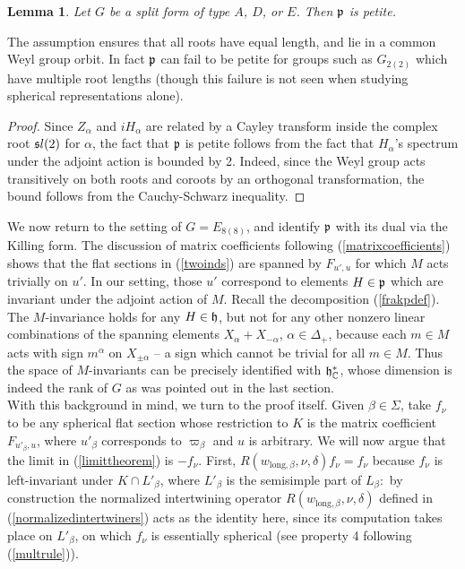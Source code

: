 \documentclass[12pt]{article}
\newtheorem{lem}[equation]{Lemma}
\numberwithin{equation}{section}
\renewcommand\a{\alpha}
\newcommand\D{\Delta}
\renewcommand\D{\Delta}
\newcommand{\C}{{\mathbb{C}}}
\renewcommand\({\left(}
\renewcommand\){\right)}
\begin{document}
\begin{lem}\label{lem:petite}
Let $G$ be a split form of type $A$, $D$, or $E$.  Then $\frak p$ is petite.
\end{lem}

\noindent The assumption ensures that all roots have equal length, and lie in a common Weyl group orbit.  In fact $\frak p$ can fail to be petite for groups such as $G_{2(2)}$ which have multiple root lengths (though this  failure is not seen when studying spherical representations alone).

\begin{proof}
 Since $Z_\a$ and $iH_\a$ are related by a Cayley transform inside the complex root ${\frak sl}(2)$ for $\alpha$, the fact that $\frak p$ is petite  follows from the fact that $H_\a$'s spectrum under the adjoint action is bounded by 2.  Indeed, since the Weyl group acts transitively on both roots and coroots by an orthogonal transformation,  the bound follows from the Cauchy-Schwarz inequality.
\end{proof}

We now return to the setting of $G=E_{8(8)}$, and
identify $\frak p$ with its dual via the Killing form.
The discussion of matrix coefficients following (\ref{matrixcoefficients}) shows that
the flat sections in  (\ref{twoinds})  are spanned by  $F_{u',u}$ for which $M$ acts trivially on $u'$.  In our setting, those $u'$ correspond to elements $H\in\frak p$ which are invariant under the adjoint action of $M$.  Recall the decomposition (\ref{frakpdef}).  The $M$-invariance holds for any $H\in \frak h$, but not for any other nonzero linear combinations of the spanning elements $X_\a+X_{-\a}$, $\a\in \D_+$, because each $m\in M$ acts with sign $m^\alpha$ on $X_{\pm \a}$ -- a sign which cannot be trivial for all $m\in M$.   Thus the space of $M$-invariants can be precisely identified with $\frak h^*_\C$, whose dimension is indeed the rank of $G$ as   was pointed out in the last section.\\


With this background in mind, we turn to the proof itself.
Given $\beta\in\Sigma$, take $f_\nu$ to be any spherical flat section whose restriction to $K$ is the matrix coefficient $F_{u'_\beta,u}$,
where $u'_\beta$ corresponds to $\varpi_\beta$ and $u$ is arbitrary.
We will now argue that the limit in (\ref{limittheorem}) is $-f_\nu$.  First, $R(w_{\text{long},\beta},\nu,\delta)f_\nu=f_\nu$ because $f_\nu$ is left-invariant under $K\cap L'_\beta$, where $L'_\beta$ is the semisimple part   of $L_\beta$:~by
construction the normalized intertwining operator $R(w_{\text{long},\beta},\nu,\delta)$ defined in (\ref{normalizedintertwiners}) acts as the identity here, since its computation takes place on $L'_\beta$, on which $f_\nu$ is essentially spherical (see property 4 following (\ref{multrule})).
\end{document}

